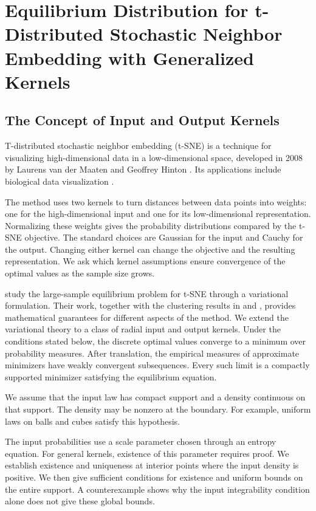 \chapter{Equilibrium Distribution for t-Distributed Stochastic Neighbor Embedding with Generalized Kernels}

\begingroup
\allowdisplaybreaks[2]

\section{The Concept of Input and Output Kernels}\label{sec_intro}
T-distributed stochastic neighbor embedding (t-SNE) is a technique for
visualizing high-dimensional data in a low-dimensional space, developed in 2008
by Laurens van der Maaten and Geoffrey Hinton \citep{key}. Its applications
include biological data visualization
\citep{LindermanGeorgeC.2019Fitf,10.1093/bioinformatics/btp035}.

The method uses two kernels to turn distances between data points into
weights: one for the high-dimensional input and one for its low-dimensional
representation. Normalizing these weights gives the probability distributions
compared by the t-SNE objective. The standard choices are Gaussian for the
input and Cauchy for the output. Changing either kernel can change the objective
and the resulting representation. We ask which kernel assumptions
ensure convergence of the optimal values as the sample size grows.

\citet{auffinger-tsne} study the large-sample equilibrium
problem for t-SNE through a variational formulation. Their work, together with
the clustering results in \cite{arora2018analysistsnealgorithmdata} and
\cite{linderman2017clusteringtsneprovably}, provides mathematical guarantees
for different aspects of the method. We extend the variational theory to a
class of radial input and output kernels. Under the conditions stated below,
the discrete optimal values converge to a minimum over probability measures.
After translation, the empirical measures of approximate minimizers have weakly convergent subsequences. Every such limit is a compactly supported minimizer satisfying the equilibrium equation.

We assume that the input law has compact support and a density continuous
on that support. The density may be nonzero at the boundary. For example,
uniform laws on balls and cubes satisfy this hypothesis.

The input probabilities use a scale parameter chosen through an entropy
equation. For general kernels, existence of this parameter requires proof.
We establish existence and uniqueness at interior points where the input
density is positive. We then give sufficient conditions for existence and
uniform bounds on the entire support. A counterexample shows why the input
integrability condition alone does not give these global bounds.


